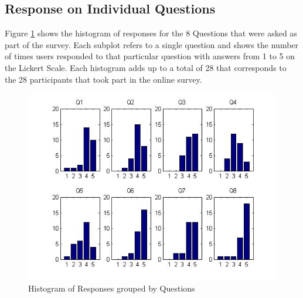 \documentclass[oneside,11pt]{memoir}
\begin{document}
\subsection{Response on Individual Questions}
Figure \ref{Fig:Figure6} shows the histogram of responses for the 8 Questions that were asked as part of the survey. Each subplot refers to a single question and shows the number of times users responded to that particular question with answers from 1 to 5 on the Lickert Scale. Each histogram adds up to a total of 28 that corresponds to the 28 participants that took part in the online survey.

\begin{figure}[h]
\includegraphics[width=5.5in]{histogram.jpg}
\caption{Histogram of Responses grouped by Questions}
\label{Fig:Figure6}
\end{figure}
\end{document}

